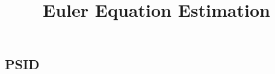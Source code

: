 \documentclass[12pt, letterpaper]{article}
\begin{document}
\begin{landscape}

\title{ \vspace{-1cm} Euler Equation Estimation \vspace{-1cm} }
\date{}
\maketitle


\section{PSID}


\pagebreak


\end{landscape}
\end{document}

